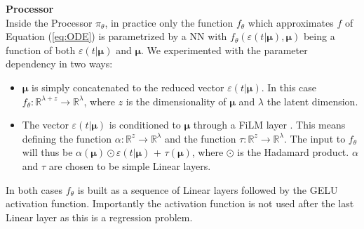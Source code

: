 \textbf{Processor}\\
Inside the Processor $\pi_\theta$, in practice only the function $f_\theta$ which approximates $f$ of Equation (\ref{eq:ODE}) is parametrized by a NN with $f_\theta(\varepsilon(t|\pmb{\mu}),\pmb{\mu})$ being a function of both $\varepsilon(t|\pmb{\mu})$ and $\pmb{\mu}$. We experimented with the parameter dependency in two ways:
\begin{itemize}
    \item $\pmb{\mu}$ is simply concatenated to the reduced vector $\varepsilon(t|\pmb{\mu})$. In this case $f_\theta:\mathbb{R}^{\lambda+z}\rightarrow\mathbb{R}^{\lambda}$, where $z$ is the dimensionality of $\pmb{\mu}$ and $\lambda$ the latent dimension. 
    \item The vector $\varepsilon(t|\pmb{\mu})$ is conditioned to $\pmb{\mu}$ through a FiLM layer \cite{perez2018film}. This means defining the function $\alpha:\mathbb{R}^z\rightarrow\mathbb{R}^{\lambda}$ and the function $\tau:\mathbb{R}^z\rightarrow\mathbb{R}^{\lambda}$. The input to $f_\theta$ will thus be $\alpha(\pmb{\mu})\odot\varepsilon(t|\pmb{\mu})$ + $\tau(\pmb{\mu})$, where $\odot$ is the Hadamard product. $\alpha$ and $\tau$ are chosen to be simple Linear layers.
\end{itemize}
In both cases $f_\theta$ is built as a sequence of Linear layers followed by the GELU activation function. Importantly the activation function is not used after the last Linear layer as this is a regression problem.

